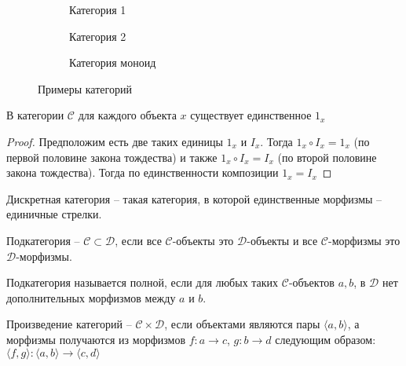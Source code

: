 \begin{figure}
\centering
\begin{subfigure}{.33\textwidth}
  \centering
  \caption{Категория 1}
  \label{fig:category-1}
\end{subfigure}%
\begin{subfigure}{.33\textwidth}
  \centering
  \caption{Категория 2}
  \label{fig:category-2}
\end{subfigure}
\begin{subfigure}{.33\textwidth}
  \centering
  \caption{Категория моноид}
  \label{fig:category-2}
\end{subfigure}
\caption{Примеры категорий}
\label{fig:category-example}
\end{figure}

\begin{thm}
  В категории $\mathcal{C}$ для каждого объекта $x$ существует единственное $1_x$
\end{thm}
\begin{proof}
  Предположим есть две таких единицы $1_x$ и $I_x$.
  Тогда $1_x \circ I_x = 1_x$ (по первой половине закона тождества)
  и также $1_x \circ I_x = I_x$ (по второй половине закона тождества).
  Тогда по единственности композиции $1_x = I_x$
\end{proof}

\begin{defn}
  Дискретная категория -- такая категория, в которой единственные морфизмы --
  единичные стрелки.
\end{defn}
\begin{defn}
  Подкатегория -- $\mathcal{C} \subset \mathcal{D}$, если все
  $\mathcal{C}$-объекты это $\mathcal{D}$-объекты и все $\mathcal{C}$-морфизмы
  это $\mathcal{D}$-морфизмы.
\end{defn}
\begin{defn}
  Подкатегория называется полной, если для любых таких $\mathcal{C}$-объектов
  $a, b$, в $\mathcal{D}$ нет дополнительных морфизмов между $a$ и $b$.
\end{defn}
\begin{defn}
  Произведение категорий -- $\mathcal{C} \times \mathcal{D}$, если объектами
  являются пары $\langle a, b \rangle$, а морфизмы получаются из морфизмов
  $f\colon a \to c$, $g\colon b \to d$ следующим образом:
  $\langle f, g \rangle\colon \langle a, b \rangle \to \langle c,d \rangle$
\end{defn}


